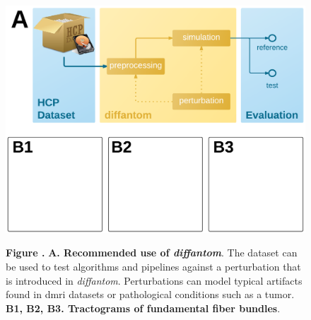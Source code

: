 \documentclass[english]{frontiers/frontiersSCNS} %
\begin{document}
\begin{figure}[h!]
\begin{center}
\includegraphics[width=\linewidth]{figures/figure02}
\end{center}
\textbf{\label{fig:figure2} Figure . }%
{\textbf{A. Recommended use of \emph{diffantom}}.
The dataset can be used to test algorithms and pipelines against a perturbation that is
  introduced in \emph{diffantom}.
Perturbations can model typical artifacts found in \gls*{dmri} datasets or pathological conditions
  such as a tumor.
\textbf{B1, B2, B3. Tractograms of fundamental fiber bundles}.
}
\end{figure}
\end{document}
